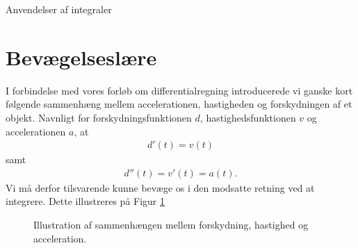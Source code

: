 \begin{center}
\Huge
	Anvendelser af integraler
\end{center}

\section*{Bevægelseslære}

I forbindelse med vores forløb om differentialregning introducerede vi ganske kort følgende sammenhæng mellem accelerationen, hastigheden og forskydningen af et objekt. Navnligt for forskydningsfunktionen $d$, hastighedsfunktionen
$v$ og accelerationen $a$, at 
\begin{align*}
	d'(t) = v(t)	
\end{align*}
samt
\begin{align*}
	d''(t) = v'(t) = a(t). 
\end{align*}
Vi må derfor tilsvarende kunne bevæge os i den modsatte retning ved at integrere. Dette illustreres på Figur \ref{fig:kinematik}
\begin{figure}[H]
	\centering
	\caption{Illustration af sammenhængen mellem forskydning, hastighed og acceleration.}
	\label{fig:kinematik}
\end{figure}
